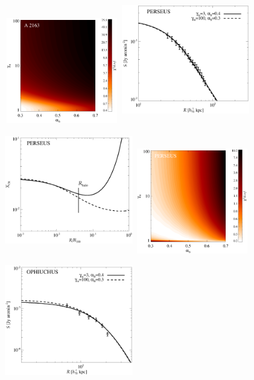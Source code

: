 \documentclass[useAMS,usenatbib]{mn2e}
\begin{document}
\begin{figure}
\includegraphics[width=5cm,height=4.6cm]{figures/ProbA2163.eps}
\includegraphics[width=5.6cm,height=5.6cm,keepaspectratio]{figures/SB_Perseus.eps}
\includegraphics[width=5.6cm,height=5.6cm,keepaspectratio]{figures/XCR_Perseus.eps}
\includegraphics[width=5cm,height=4.6cm]{figures/ProbPerseus.eps}
\includegraphics[width=5.6cm,height=5.6cm,keepaspectratio]{figures/SB_Ophiuchus.eps}

\end{figure}
\end{document}
